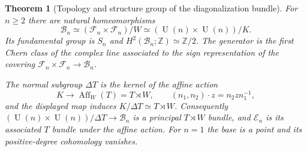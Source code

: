 \documentclass[11pt]{amsart}
\newcommand{\U}{\operatorname{U}}
\newcommand{\Z}{\mathbb Z}
\theoremstyle{plain}
\newtheorem{theorem}{Theorem}[section]
\theoremstyle{definition}
\theoremstyle{remark}
\begin{document}
\begin{theorem}[Topology and structure group of the diagonalization bundle]
\label{thm:diagonalization-base}
For $n\geq2$ there are natural homeomorphisms
\[
 \mathcal B_n\simeq(\mathcal F_n\times\mathcal F_n)/W
 \simeq(\U(n)\times\U(n))/K.
\]
Its fundamental group is $S_n$ and
$H^2(\mathcal B_n;\Z)\simeq\Z/2$.
The generator is the first Chern class of the complex line associated
to the sign representation of the covering
$\mathcal F_n\times\mathcal F_n\to\mathcal B_n$.

The normal subgroup $\Delta T$ is the kernel of the affine action
\[
 K\longrightarrow\operatorname{Aff}_W(T)=T\rtimes W,
 \qquad (n_1,n_2)\cdot z=n_2zn_1^{-1},
\]
and the displayed map induces $K/\Delta T\simeq T\rtimes W$.
Consequently $(\U(n)\times\U(n))/\Delta T\to\mathcal B_n$
is a principal $T\rtimes W$ bundle, and $\mathcal E_n$ is its
associated $T$ bundle under the affine action. For $n=1$ the base is a
point and its positive-degree cohomology vanishes.
\end{theorem}
\end{document}
